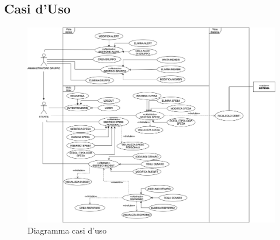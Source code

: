 \subsection{Casi d'Uso}

    \begin{figure}[h]
        \centering
        \includegraphics[width=1\textwidth, trim=3cm 0cm 1cm 0cm]{images/DiagrammaCasiDusoV2.1.png}
        \caption{Diagramma casi d'uso }
    \end{figure}
